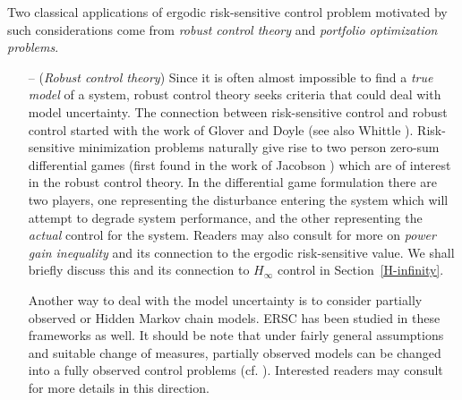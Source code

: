 \documentclass[notitlepage,11pt,reqno]{amsart}
\numberwithin{equation}{section}
\theoremstyle{plain}
\theoremstyle{definition}
\theoremstyle{remark}
\begin{document}
Two classical applications of ergodic risk-sensitive control problem motivated by such considerations  come
from {\it robust control theory} and {\it portfolio optimization problems}.
\begin{itemize}
\item[--] ({\it Robust control theory}) Since it is often almost impossible to find a {\it true model} of a system,  robust control theory seeks criteria that could deal with model uncertainty.
The connection between risk-sensitive control and robust control started with the work of Glover and Doyle \cite{MR960663} (see also Whittle \cites{Whit-81,Whit-90}). Risk-sensitive minimization problems naturally give rise to two person zero-sum
differential games (first found in the work of Jacobson \cite{J-73}) which are of interest in the robust control theory. In the differential game formulation there are two players, one representing the disturbance entering the system which will attempt to degrade system performance, and the other representing the {\it actual} control for the system. Readers may also consult \cite{Dupuis2000} for more on {\it power gain inequality} and its connection to the ergodic risk-sensitive value. We shall briefly discuss this and its connection to $H_\infty$ control  in Section~\ref{H-infinity}.

Another way to deal with the model uncertainty is to consider partially observed or Hidden Markov chain models. ERSC has been studied in these
frameworks as well. It should be note that under fairly general assumptions
and suitable change of measures, partially observed models can be changed into a fully observed control problems (cf. \cite{MR1276773}). Interested readers
may consult \cite{MR1276773,Fleming-99,MR1427787,MR1690565,BJ97} for more details in this direction.
\\[2mm]


\end{itemize}
\end{document}
